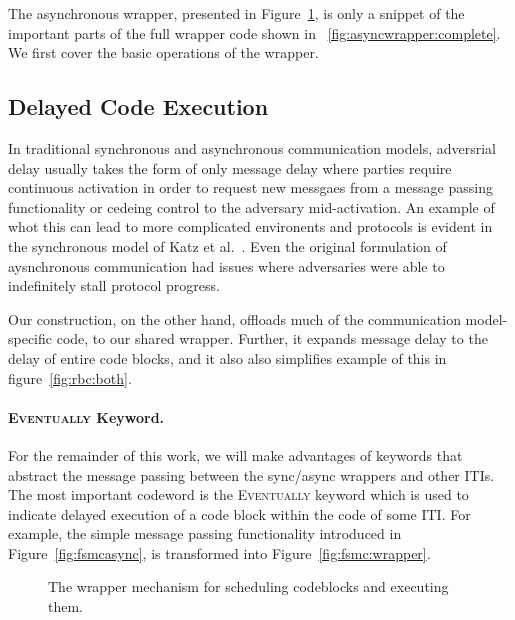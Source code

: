 The asynchronous wrapper, presented in Figure~\ref{fig:asyncwrapper:short}, is only a snippet of the important parts of the full wrapper code shown in ~\ref{fig:asyncwrapper:complete}.
We first cover the basic operations of the wrapper.


\subsection{Delayed Code Execution}
In traditional synchronous and asynchronous communication models, adversrial delay usually takes the form of only message delay where parties require continuous activation in order to request new messgaes from a message passing functionality or cedeing control to the adversary mid-activation.
An example of whot this can lead to more complicated environents and protocols is evident in the synchronous model of Katz et al.~\cite{katzclock}. 
Even the original formulation of aysnchronous communication had issues where adversaries were able to indefinitely stall protocol progress.

Our construction, on the other hand, offloads much of the communication model-specific code, to our shared wrapper.
Further, it expands message delay to the delay of entire code blocks, and it also also simplifies
example of this in figure~\ref{fig:rbc:both}.


\paragraph{\textsc{Eventually} Keyword.}
For the remainder of this work, we will make advantages of keywords that abstract the message passing between the sync/async wrappers and other ITIs.
The most important codeword is the \textsc{Eventually} keyword which is used to indicate delayed execution of a code block within the code of some ITI.
For example, the simple message passing functionality introduced in Figure~\ref{fig:fsmcasync}, is transformed into Figure~\ref{fig:fsmc:wrapper}.

\begin{figure}

\caption{The wrapper mechanism for scheduling codeblocks and executing them.}
\label{fig:asyncwrapper:short}
\end{figure}
